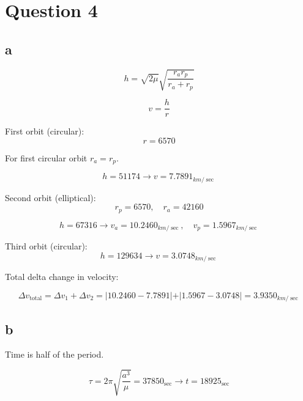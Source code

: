 \section{Question 4}

\subsection{a}
$$
h = 
\sqrt{2\mu}\sqrt{\dfrac{r_a r_p}{r_a + r_p}}
$$

$$
v = \dfrac{h}{r}
$$

First orbit (circular):
$$
r = 6570
$$

For first circular orbit $r_a = r_p$.

$$
h = 51174 \to v = 7.7891_{km/\sec}
$$

Second orbit (elliptical):
$$
r_p = 6570, \quad r_a = 42160
$$

$$
h = 67316 \to v_a = 10.2460_{km/\sec}, \quad v_p = 1.5967_{km/\sec}
$$

Third orbit (circular):
$$
h = 129634 \to v = 3.0748_{km/\sec}
$$

Total delta change in velocity:

$$
\Delta v_{\text{total}} = \Delta v_1 + \Delta v_2 = \vert 10.2460 - 7.7891 \vert + \vert 1.5967 - 3.0748 \vert = 3.9350_{km/\sec}
$$



\subsection{b}
Time is half of the period.

$$
\tau = 2\pi \sqrt{\dfrac{a^3}{\mu}} = 37850_{\sec} \to t = 18925_{\sec}
$$